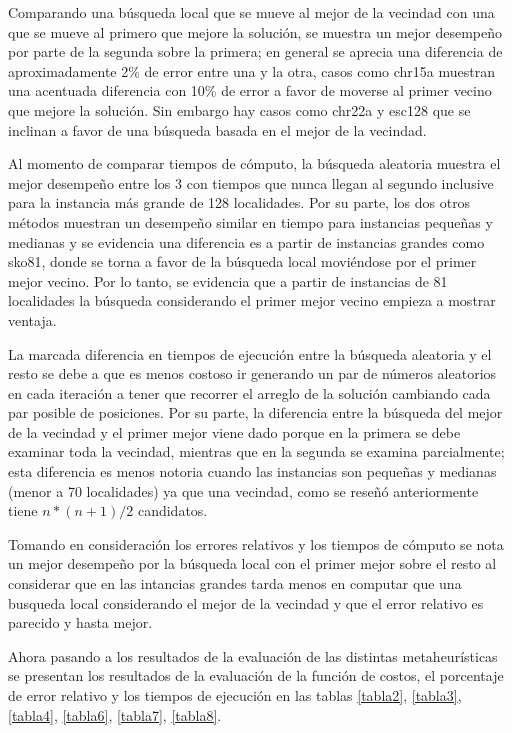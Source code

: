 \documentclass{ci5652}
\begin{document}
Comparando una búsqueda local que se mueve al mejor de la vecindad con una que se mueve al primero que mejore la solución, se muestra un mejor desempeño por parte de la segunda sobre la primera; en general se aprecia una diferencia de aproximadamente 2\% de error entre una y la otra, casos como chr15a muestran una acentuada diferencia con 10\% de error a favor de moverse al primer vecino que mejore la solución. Sin embargo hay casos como chr22a y esc128 que se inclinan a favor de una búsqueda basada en el mejor de la vecindad.

Al momento de comparar tiempos de cómputo, la búsqueda aleatoria muestra el mejor desempeño entre los 3 con tiempos que nunca llegan al segundo inclusive para la instancia más grande de 128 localidades. Por su parte, los dos otros métodos muestran un desempeño similar en tiempo para instancias pequeñas y medianas y se evidencia una diferencia es a partir de instancias grandes como sko81, donde se torna a favor de la búsqueda local moviéndose por el primer mejor vecino. Por lo tanto, se evidencia que a partir de instancias de 81 localidades la búsqueda considerando el primer mejor vecino empieza a mostrar ventaja.

La marcada diferencia en tiempos de ejecución entre la búsqueda aleatoria y el resto se debe a que es menos costoso ir generando un par de números aleatorios en cada iteración a tener que recorrer el arreglo de la solución cambiando cada par posible de posiciones. Por su parte, la diferencia entre la búsqueda del mejor de la vecindad y el primer mejor viene dado porque en la primera se debe examinar toda la vecindad, mientras que en la segunda se examina parcialmente; esta diferencia es menos notoria cuando las instancias son pequeñas y medianas (menor a 70 localidades) ya que una vecindad, como se reseñó anteriormente tiene $n*(n+1)/2$ candidatos.

Tomando en consideración los errores relativos y los tiempos de cómputo se nota un mejor desempeño por la búsqueda local con el primer mejor sobre el resto al considerar que en las intancias grandes tarda menos en computar que una busqueda local considerando el mejor de la vecindad y que el error relativo es parecido y hasta mejor.

Ahora pasando a los resultados de la evaluación de las distintas metaheurísticas se presentan los resultados de la evaluación de la función de costos, el porcentaje de error relativo y los tiempos de ejecución en las tablas \ref{tabla2}, \ref{tabla3}, \ref{tabla4}, \ref{tabla6}, \ref{tabla7}, \ref{tabla8}.
\end{document}
